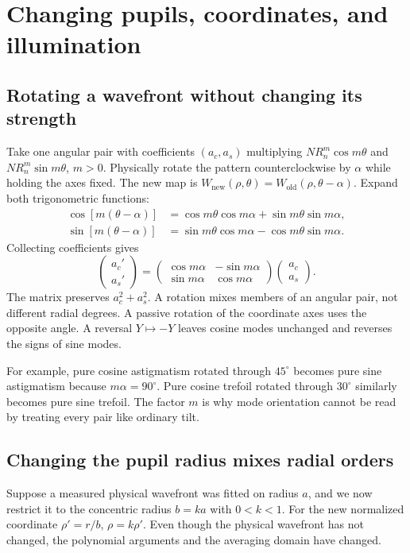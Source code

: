 \chapter{Changing pupils, coordinates, and illumination}
\label{zc:pupils}

\section{Rotating a wavefront without changing its strength}
Take one angular pair with coefficients $(a_c,a_s)$ multiplying
$N R_n^m\cos m\theta$ and $N R_n^m\sin m\theta$, $m>0$.
Physically rotate the pattern counterclockwise by $\alpha$ while
holding the axes fixed. The new map is
$W_{\mathrm{new}}(\rho,\theta)=W_{\mathrm{old}}(\rho,\theta-\alpha)$.
Expand both trigonometric functions:
\begin{align}
 \cos[m(\theta-\alpha)]
   &=\cos m\theta\cos m\alpha+\sin m\theta\sin m\alpha,\\
 \sin[m(\theta-\alpha)]
   &=\sin m\theta\cos m\alpha-\cos m\theta\sin m\alpha.
\end{align}
Collecting coefficients gives
\begin{equation}
 \begin{pmatrix}a_c'\\a_s'\end{pmatrix}=
 \begin{pmatrix}\cos m\alpha&-\sin m\alpha\\
                 \sin m\alpha&\cos m\alpha\end{pmatrix}
 \begin{pmatrix}a_c\\a_s\end{pmatrix}.
 \label{zc:rotation}
\end{equation}
The matrix preserves $a_c^2+a_s^2$. A rotation mixes members of an
angular pair, not different radial degrees. A passive rotation of the
coordinate axes uses the opposite angle. A reversal $Y\mapsto-Y$
leaves cosine modes unchanged and reverses the signs of sine modes.

For example, pure cosine astigmatism rotated through $45^\circ$ becomes
pure sine astigmatism because $m\alpha=90^\circ$. Pure cosine trefoil
rotated through $30^\circ$ similarly becomes pure sine trefoil. The
factor $m$ is why mode orientation cannot be read by treating every
pair like ordinary tilt.

\section{Changing the pupil radius mixes radial orders}
Suppose a measured physical wavefront was fitted on radius $a$, and
we now restrict it to the concentric radius $b=ka$ with $0<k<1$.
For the new normalized coordinate $\rho'=r/b$,
$\rho=k\rho'$. Even though the physical wavefront has not changed,
the polynomial arguments and the averaging domain have changed.


